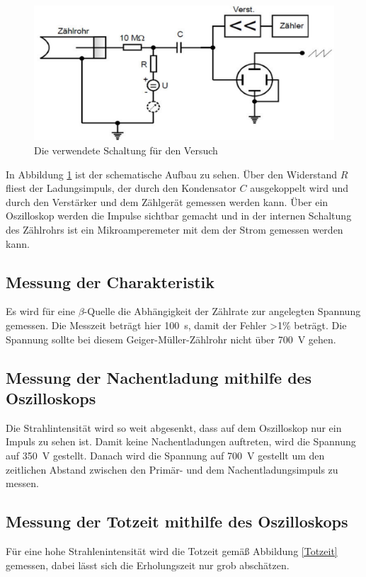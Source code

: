\begin{figure}[h!]
\centering
\includegraphics[scale=0.7]{Grafiken/Durchfuehrung.pdf}
\caption{Die verwendete Schaltung für den Versuch \cite{V703}}
\label{AB}
\end{figure}
In Abbildung \ref{AB} ist der schematische Aufbau zu sehen. Über den Widerstand $R$ fliest der Ladungsimpuls, der durch den Kondensator $C$ ausgekoppelt wird und durch den Verstärker und dem Zählgerät gemessen werden kann. Über ein Oszilloskop werden die Impulse sichtbar gemacht und in der internen Schaltung des Zählrohrs ist ein Mikroamperemeter mit dem der Strom gemessen werden kann.


\subsection{Messung der Charakteristik}
Es wird für eine $\beta$-Quelle die Abhängigkeit der Zählrate zur angelegten Spannung gemessen. Die Messzeit beträgt hier \SI{100}{\second}, damit der Fehler >1$\%$ beträgt. Die Spannung sollte bei diesem Geiger-Müller-Zählrohr nicht über \SI{700}{\volt} gehen.


\subsection{Messung der Nachentladung mithilfe des Oszilloskops}
Die Strahlintensität wird so weit abgesenkt, dass auf dem Oszilloskop nur ein Impuls zu sehen ist. Damit keine Nachentladungen auftreten, wird die Spannung auf \SI{350}{\volt} gestellt. Danach wird die Spannung auf \SI{700}{\volt} gestellt um den zeitlichen Abstand zwischen den Primär- und dem Nachentladungsimpuls zu messen.


\subsection{Messung der Totzeit mithilfe des Oszilloskops}
Für eine hohe Strahlenintensität wird die Totzeit gemäß Abbildung \ref{Totzeit} gemessen, dabei lässt sich die Erholungszeit nur grob abschätzen.


